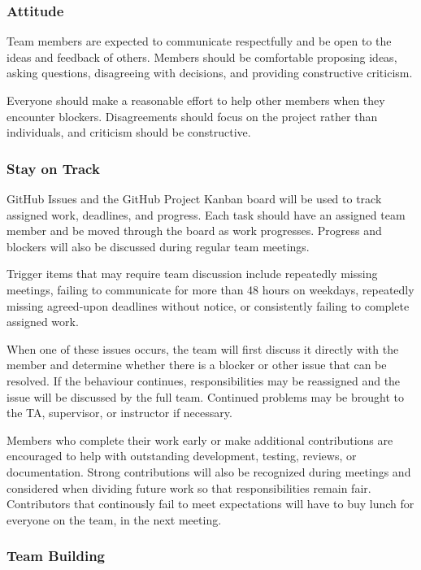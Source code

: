 \documentclass{article}
\begin{document}
\subsubsection*{Attitude}

Team members are expected to communicate respectfully and be open to the ideas and feedback of others. Members should be comfortable proposing ideas, asking questions, disagreeing with decisions, and providing constructive criticism.

Everyone should make a reasonable effort to help other members when they encounter blockers. Disagreements should focus on the project rather than individuals, and criticism should be constructive.

\subsubsection*{Stay on Track}

GitHub Issues and the GitHub Project Kanban board will be used to track assigned work, deadlines, and progress. Each task should have an assigned team member and be moved through the board as work progresses. Progress and blockers will also be discussed during regular team meetings.

Trigger items that may require team discussion include repeatedly missing meetings, failing to communicate for more than 48 hours on weekdays, repeatedly missing agreed-upon deadlines without notice, or consistently failing to complete assigned work.

When one of these issues occurs, the team will first discuss it directly with the member and determine whether there is a blocker or other issue that can be resolved. If the behaviour continues, responsibilities may be reassigned and the issue will be discussed by the full team. Continued problems may be brought to the TA, supervisor, or instructor if necessary.

Members who complete their work early or make additional contributions are encouraged to help with outstanding development, testing, reviews, or documentation. Strong contributions will also be recognized during meetings and considered when dividing future work so that responsibilities remain fair. Contributors that continously fail to meet expectations will have to buy lunch for everyone on the team, in the next meeting.

\subsubsection*{Team Building}
\end{document}
